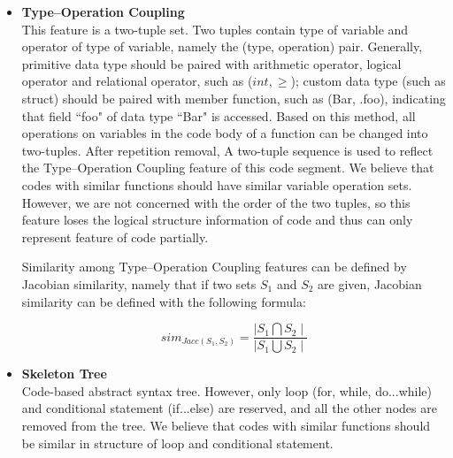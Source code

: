 \begin{itemize}
	\item \textbf{Type–Operation Coupling} \\
	This feature is a two-tuple set. Two tuples contain type of variable and operator of type of variable, namely the (type, operation) pair. Generally, primitive data type should be paired with arithmetic operator, logical operator and relational operator, such as ($int, \geq$); custom data type (such as struct) should be paired with member function, such as (Bar, .foo), indicating that field ``foo" of data type ``Bar" is accessed. Based on this method, all operations on variables in the code body of a function can be changed into two-tuples. After repetition removal, A two-tuple sequence is used to reflect the Type–Operation Coupling feature of this code segment. We believe that codes with similar functions should have similar variable operation sets. However, we are not concerned with the order of the two tuples, so this feature loses the logical structure information of code and thus can only represent feature of code partially.
	
	
	Similarity among Type–Operation Coupling features can be defined by Jacobian similarity, namely that if two sets $S_1$ and $S_2$ are given, Jacobian similarity can be defined with the following formula:
	
	
	\begin{equation}
	sim_{Jacc(S_{1}, S_{2})}=\frac{\mid S_{1}\bigcap S_{2}\mid}{\mid S_{1}\bigcup S_{2}\mid}
	\end{equation}
	
	\item \textbf{Skeleton Tree} \\
	Code-based abstract syntax tree. However, only loop (for, while, do...while) and conditional statement (if...else) are reserved, and all the other nodes are removed from the tree. We believe that codes with similar functions should be similar in structure of loop and conditional statement.
	

\end{itemize}
